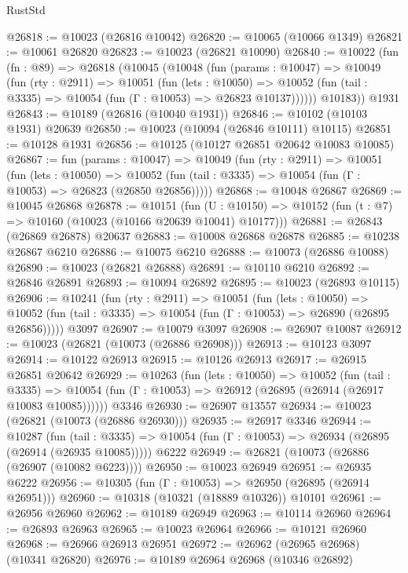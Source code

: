 \begin{lexlean}{RustStd}
\begin{coremodule}
@26818 := @10023 (@26816 @10042)
@26820 := @10065 (@10066 @1349)
@26821 := @10061 @26820
@26823 := @10023 (@26821 @10090)
@26840 := @10022
    (fun (fn : @89) =>
    @26818
      (@10045
        (@10048
          (fun (params : @10047) =>
          @10049
            (fun (rty : @2911) =>
            @10051
              (fun (lets : @10050) =>
              @10052 (fun (tail : @3335) => @10054 (fun (Γ : @10053) => @26823 @10137))))))
        @10183))
    @1931
@26843 := @10189 (@26816 (@10040 @1931))
@26846 := @10102 (@10103 @1931) @20639
@26850 := @10023 (@10094 (@26846 @10111) @10115)
@26851 := @10128 @1931
@26856 := @10125 (@10127 @26851 @20642 @10083 @10085)
@26867 := fun (params : @10047) =>
  @10049
    (fun (rty : @2911) =>
    @10051
      (fun (lets : @10050) =>
      @10052 (fun (tail : @3335) => @10054 (fun (Γ : @10053) => @26823 (@26850 @26856)))))
@26868 := @10048 @26867
@26869 := @10045 @26868
@26878 := @10151
    (fun (U : @10150) => @10152 (fun (t : @7) => @10160 (@10023 (@10166 @20639 @10041) @10177)))
@26881 := @26843 (@26869 @26878) @20637
@26883 := @10008 @26868 @26878
@26885 := @10238 @26867 @6210
@26886 := @10075 @6210
@26888 := @10073 (@26886 @10088)
@26890 := @10023 (@26821 @26888)
@26891 := @10110 @6210
@26892 := @26846 @26891
@26893 := @10094 @26892
@26895 := @10023 (@26893 @10115)
@26906 := @10241
    (fun (rty : @2911) =>
    @10051
      (fun (lets : @10050) =>
      @10052 (fun (tail : @3335) => @10054 (fun (Γ : @10053) => @26890 (@26895 @26856)))))
    @3097
@26907 := @10079 @3097
@26908 := @26907 @10087
@26912 := @10023 (@26821 (@10073 (@26886 @26908)))
@26913 := @10123 @3097
@26914 := @10122 @26913
@26915 := @10126 @26913
@26917 := @26915 @26851 @20642
@26929 := @10263
    (fun (lets : @10050) =>
    @10052
      (fun (tail : @3335) =>
      @10054 (fun (Γ : @10053) => @26912 (@26895 (@26914 (@26917 @10083 @10085))))))
    @3346
@26930 := @26907 @13557
@26934 := @10023 (@26821 (@10073 (@26886 @26930)))
@26935 := @26917 @3346
@26944 := @10287
    (fun (tail : @3335) => @10054 (fun (Γ : @10053) => @26934 (@26895 (@26914 (@26935 @10085)))))
    @6222
@26949 := @26821 (@10073 (@26886 (@26907 (@10082 @6223))))
@26950 := @10023 @26949
@26951 := @26935 @6222
@26956 := @10305 (fun (Γ : @10053) => @26950 (@26895 (@26914 @26951)))
@26960 := @10318 (@10321 (@18889 @10326)) @10101
@26961 := @26956 @26960
@26962 := @10189 @26949
@26963 := @10114 @26960
@26964 := @26893 @26963
@26965 := @10023 @26964
@26966 := @10121 @26960
@26968 := @26966 @26913 @26951
@26972 := @26962 (@26965 @26968) (@10341 @26820)
@26976 := @10189 @26964 @26968 (@10346 @26892)

\end{coremodule}
\end{lexlean}
